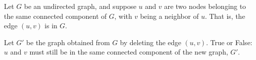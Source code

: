 \Needspace{2in}
\begin{prob}
    Let $G$ be an undirected graph, and suppose $u$ and $v$ are two nodes belonging to the
    same connected component of $G$, with $v$ being a neighbor of $u$. That is, the edge $(u, v)$
    is in $G$.

    Let $G'$ be the graph obtained from $G$ by deleting the edge $(u, v)$. True or False:
    $u$ and $v$ must still be in the same connected component of the new graph, $G'$.

    \tF{}

\end{prob}
